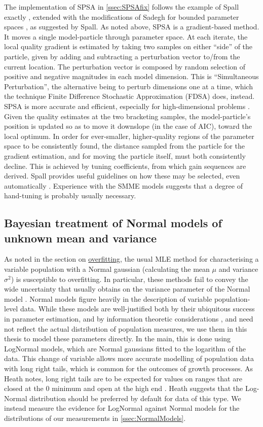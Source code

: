 The implementation of SPSA in \autoref{ssec:SPSAfix} follows the example of Spall exactly \cite{Spall1998}, extended with the modifications of Sadegh for bounded parameter spaces \cite{Sadegh1997}, as suggested by Spall. As noted above, SPSA is a gradient-based method. It moves a single model-particle through parameter space. At each iterate, the local quality gradient is estimated by taking two samples on either ``side'' of the particle, given by adding and subtracting a perturbation vector to/from the current location. The perturbation vector is composed by random selection of positive and negative magnitudes in each model dimension. This is ``Simultaneous Perturbation'', the alternative being to perturb dimensions one at a time, which the technique Finite Difference Stochastic Approximation (FDSA) does, instead. SPSA is more accurate and efficient, especially for high-dimensional problems \cite{Chin1997}. Given the quality estimates at the two bracketing samples, the model-particle's position is updated so as to move it downslope (in the case of AIC), toward the local optimum. In order for ever-smaller, higher-quality regions of the parameter space to be consistently found, the distance sampled from the particle for the gradient estimation, and for moving the particle itself, must both consistently decline. This is achieved by tuning coefficients, from which gain sequences are derived. Spall provides useful guidelines on how these may be selected, even automatically \cite{Spall1998}. Experience with the SMME models suggests that a degree of hand-tuning is probably usually necessary.

\subsection{Bayesian treatment of Normal models of unknown mean and variance}
\label{ssec:normalgamma}
As noted in the section on \hyperref[ssec:overfit]{overfitting}, the usual MLE method for characterising a variable population with a Normal gaussian (calculating the mean $\mu$ and variance $\sigma^{2}$) is susceptible to overfitting. In particular, these methods fail to convey the wide uncertainty that usually obtains on the variance parameter of the Normal model \cite{Murphy2007}. Normal models figure heavily in the description of variable population-level data. While these models are well-justified both by their ubiquitous success in parameter estimation, and by information theoretic considerations \cite{Jaynes2003}, and need not reflect the actual distribution of population measures, we use them in this thesis to model these parameters directly. In the main, this is done using LogNormal models, which are Normal gaussians fitted to the logarithm of the data. This change of variable allows more accurate modelling of population data with long right tails, which is common for the outcomes of growth processes. As Heath notes, long right tails are to be expected for values on ranges that are closed at the 0 minimum and open at the high end \cite{Heath1967}. Heath suggests that the Log-Normal distribution should be preferred by default for data of this type. We instead measure the evidence for LogNormal against Normal models for the distributions of our measurements in \autoref{ssec:NormalModels}.

